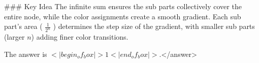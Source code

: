 ### Key Idea  
The infinite sum ensures the sub parts collectively cover the entire node, while the color assignments create a smooth gradient. Each sub part’s area ( \( \frac{1}{2^n} \) ) determines the step size of the gradient, with smaller sub parts (larger \( n \)) adding finer color transitions.  

The answer is \(<|begin_of_box|>1<|end_of_box|>\).</answer>
